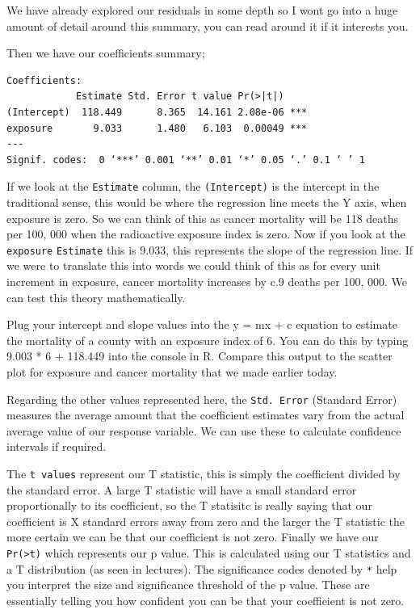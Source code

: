 \documentclass[
]{book}
\begin{document}
We have already explored our residuals in some depth so I wont go into a huge amount of detail around this summary, you can read around it if it interests you.

Then we have our coefficients summary;

\begin{verbatim}
Coefficients:
            Estimate Std. Error t value Pr(>|t|)    
(Intercept)  118.449      8.365  14.161 2.08e-06 ***
exposure       9.033      1.480   6.103  0.00049 ***
---
Signif. codes:  0 ‘***’ 0.001 ‘**’ 0.01 ‘*’ 0.05 ‘.’ 0.1 ‘ ’ 1
\end{verbatim}

If we look at the \texttt{Estimate} column, the \texttt{(Intercept)} is the intercept in the traditional sense, this would be where the regression line meets the Y axis, when exposure is zero. So we can think of this as cancer mortality will be 118 deaths per 100, 000 when the radioactive exposure index is zero. Now if you look at the \texttt{exposure} \texttt{Estimate} this is 9.033, this represents the slope of the regression line. If we were to translate this into words we could think of this as for every unit increment in exposure, cancer mortality increases by c.9 deaths per 100, 000. We can test this theory mathematically.

Plug your intercept and slope values into the y = mx + c equation to estimate the mortality of a county with an exposure index of 6. You can do this by typing 9.003 * 6 + 118.449 into the console in R. Compare this output to the scatter plot for exposure and cancer mortality that we made earlier today.

Regarding the other values represented here, the \texttt{Std.\ Error} (Standard Error) measures the average amount that the coefficient estimates vary from the actual average value of our response variable. We can use these to calculate confidence intervals if required.

The \texttt{t\ values} represent our T statistic, this is simply the coefficient divided by the standard error. A large T statistic will have a small standard error proportionally to its coefficient, so the T statisitc is really saying that our coefficient is X standard errors away from zero and the larger the T statistic the more certain we can be that our coefficient is not zero. Finally we have our \texttt{Pr(\textgreater{}\textbar{}t\textbar{})} which represents our p value. This is calculated using our T statistics and a T distribution (as seen in lectures). The significance codes denoted by \texttt{*} help you interpret the size and significance threshold of the p value. These are essentially telling you how confident you can be that your coeffieient is not zero.
\end{document}
